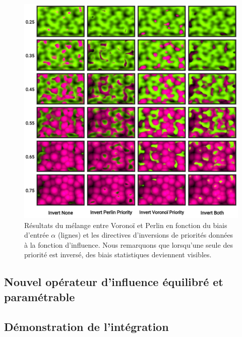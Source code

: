 \documentclass[9pt, twocolumn]{article} %
\begin{document}
\begin{figure}
  \includegraphics[width=\linewidth]{figures/MixMax_Invert.png}
  \caption{
    Résultats du mélange entre Voronoï et Perlin en fonction du biais d'entrée $\alpha$ (lignes) et les directives d'inversions de priorités données à la fonction d'influence. Nous remarquons que lorsqu'une seule des priorité est inversé, des biais statistiques deviennent visibles.
  }
  \label{fig::MixMax_Invert}
\end{figure}

\subsection{Nouvel opérateur d'influence équilibré et paramétrable}

\subsection{Démonstration de l'intégration}

\newpage

\printbibliography %
\end{document}
